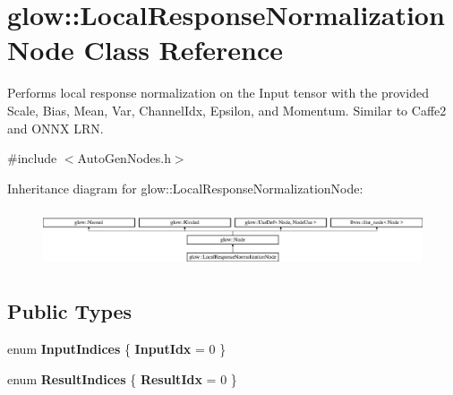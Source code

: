 \hypertarget{classglow_1_1_local_response_normalization_node}{}\section{glow\+:\+:Local\+Response\+Normalization\+Node Class Reference}
\label{classglow_1_1_local_response_normalization_node}


Performs local response normalization on the Input tensor with the provided Scale, Bias, Mean, Var, Channel\+Idx, Epsilon, and Momentum. Similar to Caffe2 and O\+N\+NX L\+RN.  




{\ttfamily \#include $<$Auto\+Gen\+Nodes.\+h$>$}

Inheritance diagram for glow\+:\+:Local\+Response\+Normalization\+Node\+:\begin{figure}[H]
\begin{center}
\leavevmode
\includegraphics[height=1.721312cm]{classglow_1_1_local_response_normalization_node}
\end{center}
\end{figure}
\subsection*{Public Types}
\begin{DoxyCompactItemize}
\item 
\mbox{\label{classglow_1_1_local_response_normalization_node_abc942754be30f03ebf13d81183974276}} 
enum {\bfseries Input\+Indices} \{ {\bfseries Input\+Idx} = 0
 \}
\item 
\mbox{\label{classglow_1_1_local_response_normalization_node_af1c3e7edbc60ae77ed50a0ec9ab981fe}} 
enum {\bfseries Result\+Indices} \{ {\bfseries Result\+Idx} = 0
 \}
\end{DoxyCompactItemize}
